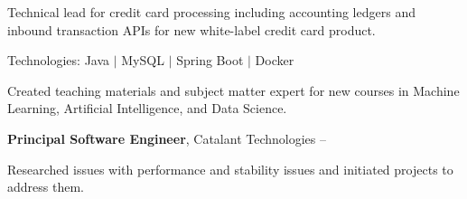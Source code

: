 \documentclass[MMMMyyyy,nonstopmode]{simpleresumecv_stacked}
\newcommand{\tech}[1]{\Gap\textrm{Technologies:} #1}
\newif\ifLOCATION
\begin{document}
\begin{Body}
\ifLOCATION
\hfill
Rochester, New York
\fi
\Gap
\begin{Detail}
Technical lead for credit card processing including accounting ledgers and inbound transaction APIs for new white-label credit card product.

\iffalse
\Gap

\BulletItem
Worked closely with developers, product owners, and operations to create a new white-label credit card product. 
\fi


\tech{Java $|$ MySQL $|$ Spring Boot $|$ Docker}

\end{Detail}

\iffalse %
\BigGap

\Entry
\textbf{Consultant} - Logical Operations \textit{(Part-Time)}
\hfill
\DatestampY{2020} - \DatestampY{2022}

\ifLOCATION
\hfill 
Rochester, New York
\fi

\begin{Detail}
\BulletItem
Created teaching materials and subject matter expert for new courses in Machine Learning, Artificial Intelligence, and Data Science.
\end{Detail}
\fi %

\BigGap

\Entry
\textbf{Principal Software Engineer}, Catalant Technologies
\hfill
 -- 

\ifLOCATION
\hfill
Rochester, New York
\fi

\Gap

\begin{Detail}

\BulletItem
Researched issues with performance and stability issues and initiated projects to address them.


\end{Detail}
\end{Body}
\end{document}
